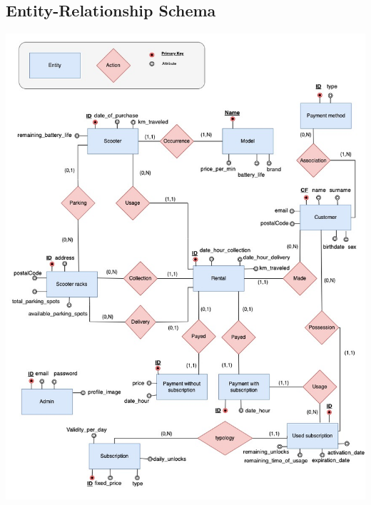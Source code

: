 \subsection{Entity-Relationship Schema}

\includegraphics[scale=0.52]{sections/DLL/Wascoot_Final_ER_Chema-Page-1.jpg}


